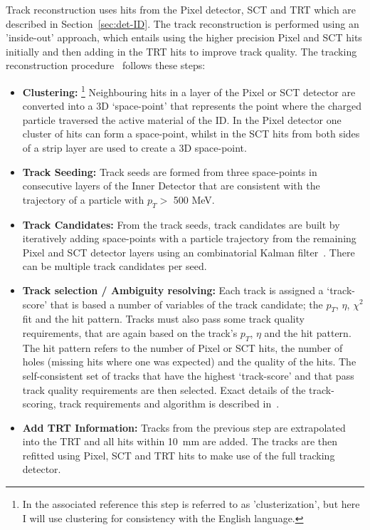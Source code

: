 Track reconstruction uses hits from the Pixel detector, SCT and TRT which are described in Section~\ref{sec:det-ID}.
The track reconstruction is performed using an 'inside-out' approach,
which entails using the higher precision Pixel and SCT hits initially
and then adding in the TRT hits to improve track quality.
The tracking reconstruction procedure~\cite{obj-tracks_TIDE} follows these steps:
\vspace{-0.5em}
\begin{itemize}[leftmargin=*]
\item\textbf{Clustering:}
  \footnote{In the associated reference this step is referred to as 'clusterization', but here I will use clustering for consistency with the English language.}
  Neighbouring hits in a layer of the Pixel or SCT detector are converted into a 3D `space-point'
  that represents the point where the charged particle traversed the active material of the ID.
  In the Pixel detector one cluster of hits can form a space-point,
  whilst in the SCT hits from both sides of a strip layer are used to create a 3D space-point.\vspace{0.5em}
\item\textbf{Track Seeding:}
  Track seeds are formed from three space-points in consecutive layers of the Inner Detector
  that are consistent with the trajectory of a particle with $p_T >$ 500 MeV.\vspace{0.5em}
\item\textbf{Track Candidates:}
  From the track seeds, track candidates are built by iteratively adding space-points with a particle trajectory
  from the remaining Pixel and SCT detector layers using an combinatorial Kalman filter~\cite{obj-tracks_kal}.
  There can be multiple track candidates per seed.\vspace{0.5em}
\item\textbf{Track selection / Ambiguity resolving:}
  Each track is assigned a `track-score' that is based a number of variables of the track candidate;
  the $p_T$, $\eta$, $\chi^{2}$ fit and the hit pattern.
  Tracks must also pass some track quality requirements, that are again based on the track's $p_T$, $\eta$ and the hit pattern.
  The hit pattern refers to the number of Pixel or SCT hits,
  the number of holes (missing hits where one was expected)
  and the quality of the hits.
  The self-consistent set of tracks that have the highest `track-score' and that pass track quality requirements are then selected.
  Exact details of the track-scoring, track requirements and algorithm is described in~\cite{obj-tracks_TIDE}.\vspace{0.5em}
\item\textbf{Add TRT Information:}
  Tracks from the previous step are extrapolated into the TRT and all hits within \SI{10}{\milli\metre} are added.
  The tracks are then refitted using Pixel, SCT and TRT hits to make use of the full tracking detector.
\end{itemize}

